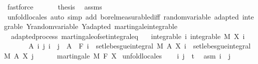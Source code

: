 \begin{isabellebody}
\ fastforce\isanewline
\ \ \isacommand{{\isacharbraceright}{\kern0pt}}\isamarkupfalse%
\isanewline
\ \ \isamarkupfalse%
\ {\isacharquery}{\kern0pt}thesis\ \isamarkupfalse%
\ assms\ \isamarkupfalse%
\ {\isacharparenleft}{\kern0pt}unfold{\isacharunderscore}{\kern0pt}locales{\isacharparenright}{\kern0pt}\ {\isacharparenleft}{\kern0pt}auto\ simp\ add{\isacharcolon}{\kern0pt}\ borel{\isacharunderscore}{\kern0pt}measurable{\isacharunderscore}{\kern0pt}diff\ random{\isacharunderscore}{\kern0pt}variable\ adapted\ integrable\ Y{\isachardot}{\kern0pt}random{\isacharunderscore}{\kern0pt}variable\ Y{\isachardot}{\kern0pt}adapted\ martingale{\isachardot}{\kern0pt}integrable{\isacharparenright}{\kern0pt}\ \ \isanewline
{}\isamarkupfalse%
%
\endisatagproof
{\isafoldproof}%
%
\isadelimproof
\isanewline
%
\endisadelimproof
\isanewline
{}\isamarkupfalse%
\isanewline
\isanewline
{}\isamarkupfalse%
\ {\isacharparenleft}{\kern0pt}\ adapted{\isacharunderscore}{\kern0pt}process{\isacharparenright}{\kern0pt}\ martingale{\isacharunderscore}{\kern0pt}of{\isacharunderscore}{\kern0pt}set{\isacharunderscore}{\kern0pt}integral{\isacharunderscore}{\kern0pt}eq{\isacharcolon}{\kern0pt}\isanewline
\ \ \ integrable{\isacharcolon}{\kern0pt}\ {\isachardoublequoteopen}{\isasymAnd}i{\isachardot}{\kern0pt}\ integrable\ M\ {\isacharparenleft}{\kern0pt}X\ i{\isacharparenright}{\kern0pt}{\isachardoublequoteclose}\isanewline
\ \ \ \ \ \ \ {\isachardoublequoteopen}{\isasymAnd}A\ i\ j{\isachardot}{\kern0pt}\ i\ {\isasymle}\ j\ {\isasymLongrightarrow}\ A\ {\isasymin}\ F\ i\ {\isasymLongrightarrow}\ set{\isacharunderscore}{\kern0pt}lebesgue{\isacharunderscore}{\kern0pt}integral\ M\ A\ {\isacharparenleft}{\kern0pt}X\ i{\isacharparenright}{\kern0pt}\ {\isacharequal}{\kern0pt}\ set{\isacharunderscore}{\kern0pt}lebesgue{\isacharunderscore}{\kern0pt}integral\ M\ A\ {\isacharparenleft}{\kern0pt}X\ j{\isacharparenright}{\kern0pt}{\isachardoublequoteclose}\ \isanewline
\ \ \ \ \ {\isachardoublequoteopen}martingale\ M\ F\ X{\isachardoublequoteclose}\isanewline
%
\isadelimproof
%
\endisadelimproof
%
\isatagproof
{}\isamarkupfalse%
\ {\isacharparenleft}{\kern0pt}unfold{\isacharunderscore}{\kern0pt}locales{\isacharparenright}{\kern0pt}\isanewline
\ \ \isamarkupfalse%
\ i\ j\ {\isacharcolon}{\kern0pt}{\isacharcolon}{\kern0pt}\ {\isacharprime}{\kern0pt}t\ \isamarkupfalse%
\ asm{\isacharcolon}{\kern0pt}\ {\isachardoublequoteopen}i\ {\isasymle}\ j{\isachardoublequoteclose}\isanewline

\end{isabellebody}
